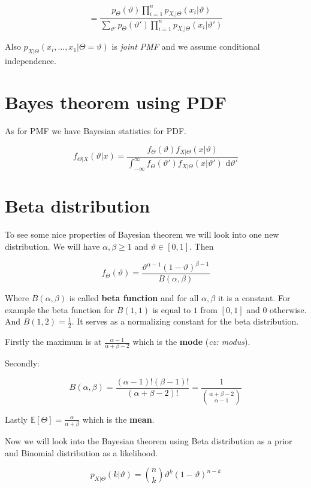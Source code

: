 $$
= \frac{p_{\Theta}(\vartheta) \prod_{i=1}^{n}p_{X_{i}\vert \Theta} (x_{i} \vert \vartheta)}{\sum_{\vartheta'} p_{\Theta}(\vartheta')\prod_{i=1}^{n}p_{X_{i}\vert \Theta} (x_{i} \vert \vartheta')}
$$

Also $p_{X \vert \Theta}(x_{i}, \dots, x_{1} \vert \Theta = \vartheta)$ is \textit{joint PMF} and we assume conditional independence.

\section{Bayes theorem using PDF}

As for PMF we have Bayesian statistics for PDF.

$$
f_{\Theta \vert X}(\vartheta \vert x) = \frac{f_{\Theta}(\vartheta) f_{X \vert \Theta}(x \vert \vartheta)}{\int_{-\infty}^{\infty} f_{\Theta}(\vartheta') f_{X \vert \Theta} (x \vert \vartheta') \text{ d} \vartheta'}
$$

\section{Beta distribution}

To see some nice properties of Bayesian theorem we will look into one new distribution. We will have $\alpha, \beta \geq 1$ and $\vartheta \in [0,1]$. Then

$$
f_{\Theta} (\vartheta) = \frac{\vartheta^{\alpha - 1} (1-\vartheta)^{\beta - 1}}{B (\alpha,\beta)}
$$

Where $B(\alpha, \beta)$ is called \textbf{beta function} and for all $\alpha, \beta$ it is a constant. For example the beta function for $B(1,1)$ is equal to $1$ from $[0,1]$ and $0$ otherwise. And $B(1,2) = \frac{1}{2}$. It serves as a normalizing constant for the beta distribution.

Firstly the maximum is at $\frac{\alpha -1}{\alpha + \beta - 2}$ which is the \textbf{mode} (\textit{cz: modus}).

Secondly:

$$
B(\alpha, \beta) = \frac{(\alpha - 1)! (\beta - 1)!}{(\alpha+\beta-2)!} = \frac{1}{\binom{\alpha + \beta - 2}{\alpha -1}}
$$

Lastly $\mathbb{E} [\Theta] = \frac{\alpha}{\alpha + \beta}$ which is the \textbf{mean}.

Now we will look into the Bayesian theorem using Beta distribution as a prior and Binomial distribution as a likelihood.

$$
p_{X \vert \Theta}(k \vert \vartheta) = \binom{n}{k} \vartheta^{k} (1-\vartheta)^{n-k}
$$

